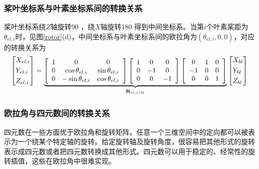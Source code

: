 \subsubsection{桨叶坐标系与叶素坐标系间的转换关系}
桨叶坐标系绕$Z$轴旋转90 \degree ，绕$X$轴旋转180 \degree 得到中间坐标系。当第$i$个叶素桨距为$\theta_{el,i}$时，见图\ref{rotor}(d)，中间坐标系与叶素坐标系间的欧拉角为$(\theta_{el,i}, 0, 0)$，对应的转换关系为
\begin{equation}
  \left[ \begin{gathered}
    {X_{el,i}} \hfill \\
    {Y_{el,i}} \hfill \\
    {Z_{el,i}} \hfill \\ 
  \end{gathered}  \right] = \underbrace {\left[ {\begin{array}{*{20}{c}}
    1&0&0 \\ 
    0&{\cos {\theta _{el,i}}}&{\sin {\theta _{el,i}}} \\ 
    0&{ - \sin {\theta _{el,i}}}&{\cos {\theta _{el,i}}} 
  \end{array}} \right]\left[ {\begin{array}{*{20}{c}}
    1&0&0 \\ 
    0&{ - 1}&0 \\ 
    0&0&{ - 1} 
  \end{array}} \right]\left[ {\begin{array}{*{20}{c}}
    0&1&0 \\ 
    { - 1}&0&0 \\ 
    0&0&1 
  \end{array}} \right]}_{{{\mathbf{R}}_{el,i/bl}}}\left[ \begin{gathered}
    {X_{bl}} \hfill \\
    {Y_{bl}} \hfill \\
    {Z_{bl}} \hfill \\ 
  \end{gathered}  \right]
\end{equation}

\subsubsection{欧拉角与四元数间的转换关系}
四元数在一些方面优于欧拉角和旋转矩阵。任意一个三维空间中的定向都可以被表示为一个绕某个特定轴的旋转。给定旋转轴及旋转角度，很容易把其他形式的旋转表示成四元数或者把四元数转换成其他形式。四元数可以用于稳定的、经常性的旋转插值，这些在欧拉角中很难实现。

